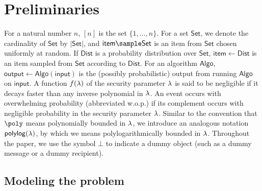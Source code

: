 \documentclass[runningheads,a4paper]{llncs}
\begin{document}

\iffalse
\todo{Add Technical challenge 3: suppressing bruising leakage. }
\fi

\section{Preliminaries}
For a natural number $n$, $[n]$ is the set $\{1, \dots, n\}$. For a set $\mathsf{Set}$, we denote the cardinality of $\mathsf{Set}$ by $|\mathsf{Set}|$, and $\mathsf{item} \sample \mathsf{Set}$ is an item from $\mathsf{Set}$ chosen uniformly at random. If $\mathsf{Dist}$ is a probability distribution over $\mathsf{Set}$, $\mathsf{item} \gets \mathsf{Dist}$ is an item sampled from $\mathsf{Set}$ according to $\mathsf{Dist}$. For an algorithm $\mathsf{Algo}$, $\mathsf{output} \gets \mathsf{Algo}(\mathsf{input})$ is the (possibly probabilistic) output from running $\mathsf{Algo}$ on $\mathsf{input}$.
A function $f(\lambda)$ of the security parameter $\lambda$ is said to be negligible if it decays faster than any inverse polynomial in $\lambda$. An event occurs with overwhelming probability (abbreviated w.o.p.) if its complement occurs with negligible probability {in the security parameter $\lambda$}. 
Similar to the convention that $\poly$ means polynomially bounded in $\lambda$, we introduce an analogous notation $\mathsf{polylog}(\lambda)$, by which we means polylogarithmically bounded in $\lambda$. 
Throughout the paper, we use the symbol $\bot$ to indicate a dummy object (such as a dummy message or a dummy recipient). 

\subsection{Modeling the problem} 
\end{document}

